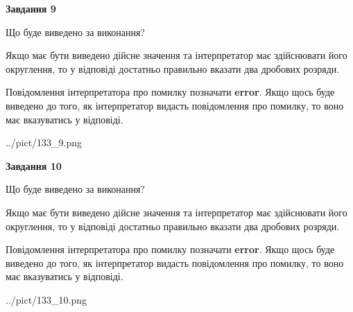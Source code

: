 \documentclass[12pt, ukrainian]{article}
\begin{document}
{\begin {Large}
{\begin {center}\textbf{Завдання 9}\end {center}}\par
Що буде виведено за виконання? \par

Якщо має бути виведено дійсне значення та інтерпретатор має здійснювати його округлення, 
то у відповіді достатньо правильно вказати два дробових розряди.

Повідомлення інтерпретатора про помилку позначати \textbf{error}.
Якщо щось буде виведено до того, як інтерпретатор видасть повідомлення про помилку, 
то воно має вказуватись у відповіді. \par

\begin{center}
	{../pict/133_9.png}
\end{center}
\newpage

{\begin {center}\textbf{Завдання 10}\end {center}}\par
Що буде виведено за виконання? \par

Якщо має бути виведено дійсне значення та інтерпретатор має здійснювати його округлення, 
то у відповіді достатньо правильно вказати два дробових розряди.

Повідомлення інтерпретатора про помилку позначати \textbf{error}.
Якщо щось буде виведено до того, як інтерпретатор видасть повідомлення про помилку, 
то воно має вказуватись у відповіді. \par

\begin{center}
	{../pict/133_10.png}
\end{center}
\newpage

\end {Large}}
\end{document}

